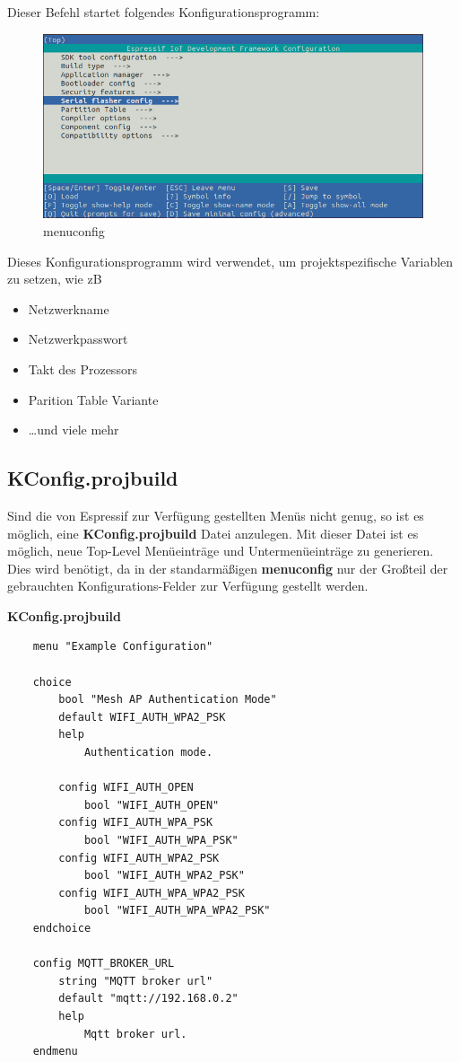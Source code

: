 Dieser Befehl startet folgendes Konfigurationsprogramm:
\begin{figure}[H]
    \begin{center}
        \includegraphics[scale=0.5]{images/menuconfig.png}
        \caption{menuconfig \cite{menuconfig_picture}}
    \end{center}
\end{figure}
Dieses Konfigurationsprogramm wird verwendet, um projektspezifische Variablen zu setzen, wie zB
\begin{itemize}
    \item Netzwerkname
    \item Netzwerkpasswort
    \item Takt des Prozessors
    \item Parition Table Variante
    \item \dots und viele mehr
\end{itemize}


\subsection{KConfig.projbuild}\label{sec:esp-idf-projbuild}
Sind die von Espressif zur Verfügung gestellten Menüs nicht genug, so ist es möglich, eine \textbf{KConfig.projbuild} Datei anzulegen. Mit dieser Datei ist es möglich, neue Top-Level Menüeinträge und Untermenüeinträge zu generieren. Dies wird benötigt, da in der standarmäßigen \textbf{menuconfig} nur der Großteil der gebrauchten Konfigurations-Felder zur Verfügung gestellt werden. 

\pagebreak
\textbf{KConfig.projbuild}
\begin{verbatim}
    menu "Example Configuration"

    choice
        bool "Mesh AP Authentication Mode"
        default WIFI_AUTH_WPA2_PSK
        help
            Authentication mode.

        config WIFI_AUTH_OPEN
            bool "WIFI_AUTH_OPEN"
        config WIFI_AUTH_WPA_PSK
            bool "WIFI_AUTH_WPA_PSK"
        config WIFI_AUTH_WPA2_PSK
            bool "WIFI_AUTH_WPA2_PSK"
        config WIFI_AUTH_WPA_WPA2_PSK
            bool "WIFI_AUTH_WPA_WPA2_PSK"
    endchoice

    config MQTT_BROKER_URL
        string "MQTT broker url"
        default "mqtt://192.168.0.2"
        help
            Mqtt broker url.
    endmenu
\end{verbatim}

